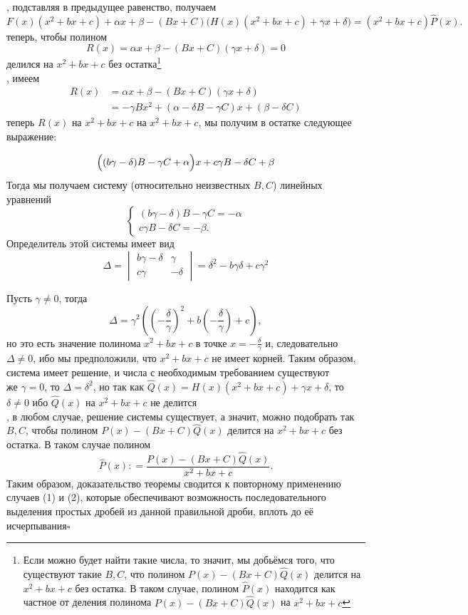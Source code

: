 \documentclass[a4paper]{article}
\newcommand{\qed}{\hfill$\square$}
\begin{document}
, подставляя в предыдущее равенство, получаем
$$
F(x)(x^2 + bx + c) + \alpha x + \beta - (Bx +C) \bigl( H(x)(x^2 + bx + c) + \gamma x + \delta\bigr) = (x^2 + bx + c) \widehat{P}(x).
$$
 теперь, чтобы полином
$$
R(x) = \alpha x + \beta  - (Bx + C) (\gamma x +\delta ) =0
$$
делился на $x^2 + bx + c$ без остатка\footnote[1]{Если можно будет найти такие числа, то значит, мы добьёмся того, что существуют такие $B,C$, что полином $P(x) - (Bx + C)\widehat{Q}(x)$ делится на $x^2 + bx + c$ без остатка. В таком случае, полином $\widehat{P}(x)$ находится как частное от деления полинома $P(x) - (Bx + C)\widehat{Q}(x)$ на $x^2 + bx + c$}\\[2mm]
, имеем
$$\begin{aligned}
R(x) &= \alpha x + \beta  - (Bx + C) (\gamma x +\delta )  \\
&= - \gamma B x^2 + (\alpha - \delta B - \gamma C)x + (\beta - \delta C)
\end{aligned}$$
 теперь $R(x)$ на $x^2 + bx +c $ на $x^2 + bx +c$, мы получим в остатке следующее выражение:

$$
\Bigl( (b \gamma - \delta)B - \gamma C  + \alpha \Bigr)x + c \gamma B - \delta C + \beta
$$
Тогда мы получаем систему (относительно неизвестных $B,C$) линейных уравнений
$$
\begin{cases}
(b \gamma - \delta)B - \gamma C =- \alpha \\
c \gamma B - \delta C =- \beta.
\end{cases}
$$
Определитель этой системы имеет вид
$$
\Delta = \begin{vmatrix}
b \gamma - \delta & \gamma \\
c\gamma & -\delta
\end{vmatrix} = \delta^2 - b\gamma \delta + c \gamma^2
$$

Пусть $\gamma \ne 0$, тогда
$$
\Delta = \gamma^2 \left( \left( -\frac{\delta}{\gamma} \right)^2 + b \left(-\frac{\delta}{\gamma}\right) + c \right),
$$
но это есть значение полинома $x^2 + bx +c$ в точке $x = -\frac{\delta}{\gamma}$ и, следовательно $\Delta \ne 0$, ибо мы предположили, что $x^2 + bx +c$ не имеет корней. Таким образом, система имеет решение, и числа с необходимым требованием существуют\\[2mm]
 же $\gamma =0$, то $\Delta = \delta^2$, но так как $\widehat{Q}(x) = H(x)(x^2 + bx + c) + \gamma x + \delta$, то $\delta \ne 0$ ибо $\widehat{Q}(x)$ на $x^2 + bx +c$ не делится\\[2mm]
, в любом случае, решение системы существует, а значит, можно подобрать так $B,C$, чтобы полином $P(x) - (Bx + C)\widehat{Q}(x)$ делится на $x^2 + bx + c$ без остатка. В таком случае полином
$$
\widehat{P}(x): = \frac{P(x) - (Bx + C)\widehat{Q}(x)}{x^2 + bx + c}.
$$
Таким образом, доказательство теоремы сводится к повторному применению случаев (1) и (2), которые обеспечивают возможность последовательного выделения простых дробей из данной правильной дроби, вплоть до её исчерпывания\qed
\end{document}
